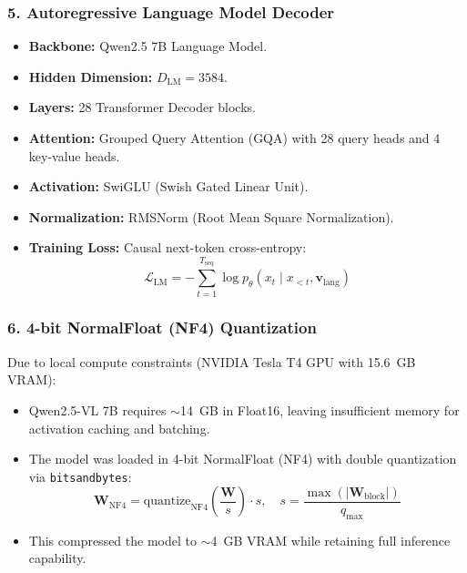 \documentclass[a4paper, 11pt]{article}
\begin{document}
\subsubsection{5. Autoregressive Language Model Decoder}
\begin{itemize}
    \item \textbf{Backbone:} Qwen2.5 7B Language Model.
    \item \textbf{Hidden Dimension:} $D_{\text{LM}} = 3584$.
    \item \textbf{Layers:} 28 Transformer Decoder blocks.
    \item \textbf{Attention:} Grouped Query Attention (GQA) with 28 query heads and 4 key-value heads.
    \item \textbf{Activation:} SwiGLU (Swish Gated Linear Unit).
    \item \textbf{Normalization:} RMSNorm (Root Mean Square Normalization).
    \item \textbf{Training Loss:} Causal next-token cross-entropy:
    \begin{equation}
        \mathcal{L}_{\text{LM}} = -\sum_{t=1}^{T_{\text{seq}}} \log p_\theta(x_t \mid x_{<t}, \mathbf{v}_{\text{lang}})
    \end{equation}
\end{itemize}

\subsubsection{6. 4-bit NormalFloat (NF4) Quantization}
Due to local compute constraints (NVIDIA Tesla T4 GPU with 15.6~GB VRAM):
\begin{itemize}
    \item Qwen2.5-VL 7B requires $\sim$14~GB in Float16, leaving insufficient memory for activation caching and batching.
    \item The model was loaded in 4-bit NormalFloat (NF4) with double quantization via \texttt{bitsandbytes}:
    \begin{equation}
        \mathbf{W}_{\text{NF4}} = \text{quantize}_{\text{NF4}}\left(\frac{\mathbf{W}}{s}\right) \cdot s, \quad s = \frac{\max(|\mathbf{W}_{\text{block}}|)}{q_{\max}}
    \end{equation}
    \item This compressed the model to $\sim$4~GB VRAM while retaining full inference capability.
\end{itemize}
\end{document}
